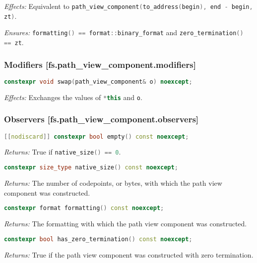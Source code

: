\documentclass[11pt]{article}
\newcommand{\code}[2][cpp]{\lstinline[language=#1,basicstyle=\small\ttfamily]{#2}}
\newcommand{\desc}[1]{\textit{#1}}
\newcommand{\effects}{\desc{Effects: }}
\newcommand{\ensures}{\desc{Ensures: }}
\newcommand{\returns}{\desc{Returns: }}
\begin{document}
\effects Equivalent to \code{path_view_component(to_address(begin), end - begin, zt)}.

\ensures \code{formatting() == format::binary_format} and \code{zero_termination() == zt}.\\

\subsubsection*{Modifiers [fs.path\_view\_component.modifiers]}

\begin{lstlisting}[language=cpp]
    constexpr void swap(path_view_component& o) noexcept;
\end{lstlisting}

\effects Exchanges the values of \code{*this} and \code{o}.\\

\subsubsection*{Observers [fs.path\_view\_component.observers]}

\begin{lstlisting}[language=cpp]
    [[nodiscard]] constexpr bool empty() const noexcept;
\end{lstlisting}

\returns True if \code{native_size() == 0}.\\

\begin{lstlisting}[language=cpp]
    constexpr size_type native_size() const noexcept;
\end{lstlisting}

\returns The number of codepoints, or bytes, with which the path view component was constructed.\\

\begin{lstlisting}[language=cpp]
    constexpr format formatting() const noexcept;
\end{lstlisting}

\returns The formatting with which the path view component was constructed.\\

\begin{lstlisting}[language=cpp]
    constexpr bool has_zero_termination() const noexcept;
\end{lstlisting}

\returns True if the path view component was constructed with zero termination.\\
\end{document}
